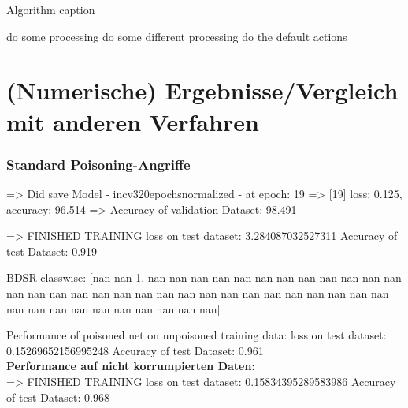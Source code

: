 \documentclass[twoside, 12pt,a4paper]{article}
\numberwithin{equation}{section}
\begin{document}
	\begin{algorithm}
		\caption{Algorithm caption}
		\label{alg:algorithm-label}
		\begin{algorithmic}
			\STATE do some processing
			\STATE do some different processing
			\ELSE
			\STATE do the default actions
			\ENDIF
		\end{algorithmic}
	\end{algorithm}
	
	\section{(Numerische) Ergebnisse/Vergleich mit anderen Verfahren} \label{chapter_comparisons}\subsubsection{Standard Poisoning-Angriffe}
	
	
	=> Did save Model - incv320epochsnormalized - at epoch: 19
	=>	[19] loss: 0.125, accuracy: 96.514%
	=>	Accuracy of validation Dataset: 98.491%
	
	=>	FINISHED TRAINING
	loss on test dataset: 3.284087032527311
	Accuracy of test Dataset: 0.919 
	
	BDSR classwise:
	[nan nan  1. nan nan nan nan nan nan nan nan nan nan nan nan nan nan nan
	nan nan nan nan nan nan nan nan nan nan nan nan nan nan nan nan nan nan
	nan nan nan nan nan nan nan]
	
	Performance of poisoned net on unpoisoned training data:
	loss on test dataset: 0.15269652156995248
	Accuracy of test Dataset: 0.961 \\
	
	
	\noindent \textbf{Performance auf nicht korrumpierten Daten:}\\
	=>	FINISHED TRAINING
	loss on test dataset: 0.15834395289583986
	Accuracy of test Dataset: 0.968 \\
	
	
	
\end{document}
